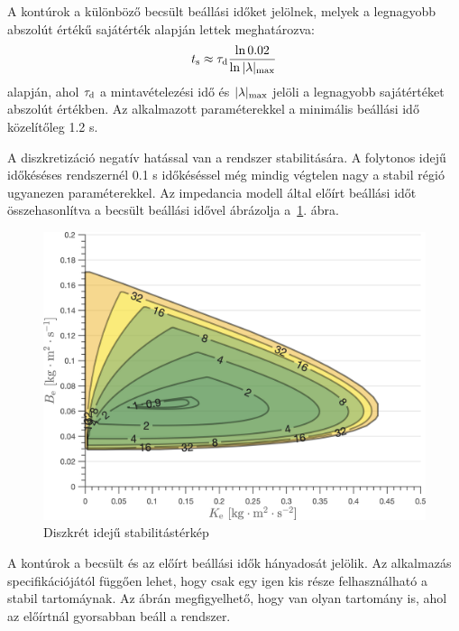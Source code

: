 A kontúrok a különböző becsült beállási időket jelölnek, melyek a legnagyobb abszolút értékű sajátérték 
alapján lettek meghatározva:
\begin{align}
    \begin{split}
        t_{\mathrm{s}} \approx \tau_{\mathrm{d}} \frac{\ln{0.02}}{\ln{|\lambda|_{\mathrm{max}}}}
    \end{split}        
\end{align}
alapján, ahol \(\tau_{\mathrm{d}}\) a mintavételezési idő és \(|\lambda|_{\mathrm{max}}\) jelöli a legnagyobb sajátértéket 
abszolút értékben. Az alkalmazott paraméterekkel a minimális beállási idő közelítőleg 1.2 s. 

A diszkretizáció negatív hatással van a rendszer stabilitására. A folytonos idejű időkéséses rendszernél 0.1 s 
időkéséssel még mindig végtelen nagy a stabil régió ugyanezen paraméterekkel. Az impedancia modell által 
előírt beállási időt összehasonlítva a becsült beállási idővel ábrázolja a~\ref{fig:time_delay_stab_map_discrete_diff}.
ábra.

\begin{figure}[H]
    \begin{center}
    \includegraphics[width=\textwidth]{images/time_delay_stab_map_discrete_diff.png}
    \caption{Diszkrét idejű stabilitástérkép}\label{fig:time_delay_stab_map_discrete_diff}
    \end{center}
\end{figure}

A kontúrok a becsült és az előírt beállási idők hányadosát jelölik. Az alkalmazás specifikációjától függően lehet, 
hogy csak egy igen kis része felhasználható a stabil tartomáynak. Az ábrán megfigyelhető, hogy van olyan tartomány is, 
ahol az előírtnál gyorsabban beáll a rendszer.

